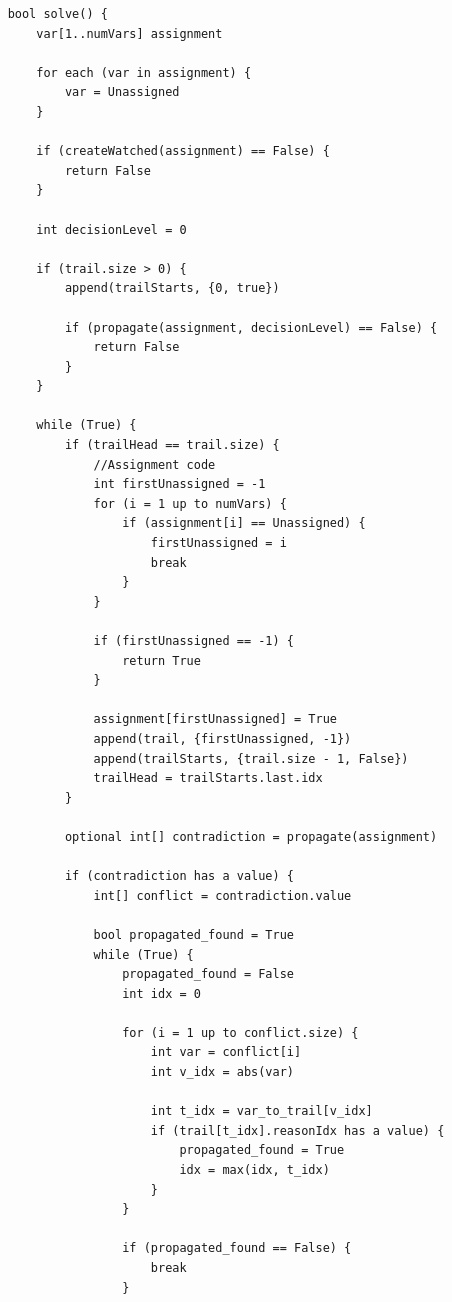 \documentclass[../main.tex]{subfiles}
\begin{document}
\begin{lstlisting}
    bool solve() {
        var[1..numVars] assignment

        for each (var in assignment) {
            var = Unassigned
        }

        if (createWatched(assignment) == False) {
            return False
        }

        int decisionLevel = 0

        if (trail.size > 0) {
            append(trailStarts, {0, true})

            if (propagate(assignment, decisionLevel) == False) {
                return False
            }
        }

        while (True) {
            if (trailHead == trail.size) {
                //Assignment code
                int firstUnassigned = -1
                for (i = 1 up to numVars) {
                    if (assignment[i] == Unassigned) {
                        firstUnassigned = i
                        break
                    }
                }

                if (firstUnassigned == -1) {
                    return True
                }

                assignment[firstUnassigned] = True
                append(trail, {firstUnassigned, -1})
                append(trailStarts, {trail.size - 1, False})
                trailHead = trailStarts.last.idx
            }

            optional int[] contradiction = propagate(assignment)

            if (contradiction has a value) {
                int[] conflict = contradiction.value

                bool propagated_found = True
                while (True) {
                    propagated_found = False
                    int idx = 0

                    for (i = 1 up to conflict.size) {
                        int var = conflict[i]
                        int v_idx = abs(var)

                        int t_idx = var_to_trail[v_idx]
                        if (trail[t_idx].reasonIdx has a value) {
                            propagated_found = True
                            idx = max(idx, t_idx)
                        }
                    }

                    if (propagated_found == False) {
                        break
                    }


\end{lstlisting}
\end{document}

